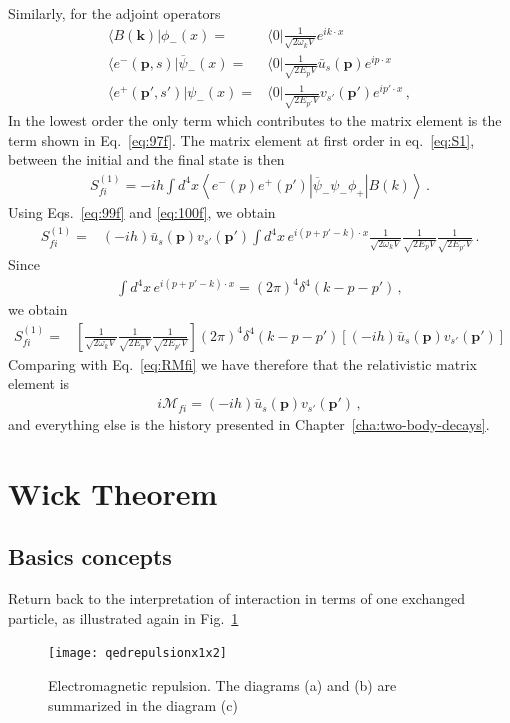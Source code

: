 Similarly, for the adjoint operators
\begin{align}
  \label{eq:100f}
   \langle B(\mathbf{k})|\phi_-(x)=&\langle0|\frac{1}{\sqrt{2 \omega_k V}}e^{i k\cdot x}\nonumber\\
  \langle e^-(\mathbf{p},s)|\overline{\psi}_-(x)=&\langle0|\frac{1}{\sqrt{2 E_p V}}\bar{u}_s(\mathbf{p})e^{i p\cdot x}\nonumber\\
  \langle e^+(\mathbf{p}',s')|\psi_-(x)=&\langle0|\frac{1}{\sqrt{2 E_{p'} V}}v_{s'}(\mathbf{p}')e^{i p'\cdot x}\,,
\end{align}
In the lowest order the only term which contributes to the matrix element is the term shown in Eq.~\eqref{eq:97f}.
The matrix element at first order in eq.~\eqref{eq:S1}, between the initial and the final state is then
\begin{align}
  S_{fi}^{(1)}=-i h \int d^4x\left\langle e^-(p)e^+(p')\left|\overline{\psi}_-\psi_-\phi_+\right|B(k)\right\rangle\,.
\end{align}
Using Eqs.~\eqref{eq:99f} and \eqref{eq:100f}, we obtain
\begin{align}
  S_{fi}^{(1)}=&(-i h)\bar{u}_s(\mathbf{p}) v_{s'}(\mathbf{p}')
\int d^4x\,e^{i(p+p'-k)\cdot x}\frac{1}{\sqrt{2\omega_k V}}\frac{1}{\sqrt{2E_p V}}\frac{1}{\sqrt{2E_{p'} V}}\,.
\end{align}
Since
\begin{align}
  \int d^4x\,e^{i(p+p'-k)\cdot x}=(2\pi)^4\delta^4(k-p-p')\,,
\end{align}
we obtain
\begin{align}
  S_{fi}^{(1)}=&\left[\frac{1}{\sqrt{2\omega_k V}}\frac{1}{\sqrt{2E_p V}}\frac{1}{\sqrt{2E_{p'} V}}\right]
(2\pi)^4\delta^4(k-p-p')\left[(-i h)\bar{u}_s(\mathbf{p}) v_{s'}(\mathbf{p}')\right]
\end{align}
Comparing with Eq.~\eqref{eq:RMfi} we have therefore that the relativistic matrix element is
\begin{align}
  i\mathcal{M}_{fi}=(-i h)\bar{u}_s(\mathbf{p}) v_{s'}(\mathbf{p}')\,,
\end{align}
and everything else is the history presented in Chapter~\ref{cha:two-body-decays}. 

\section{Wick Theorem}
\label{sec:wick-theorem}

\subsection{Basics concepts}
Return back to  the interpretation of interaction in terms of one exchanged particle, as illustrated again in Fig.~\ref{fig:qedrepulsionx1x2}
\begin{figure}
  \centering
  \texttt{[image: qedrepulsionx1x2]}
  \caption{Electromagnetic repulsion. The diagrams (a) and (b) are summarized in the diagram (c)}
  \label{fig:qedrepulsionx1x2}
\end{figure}


